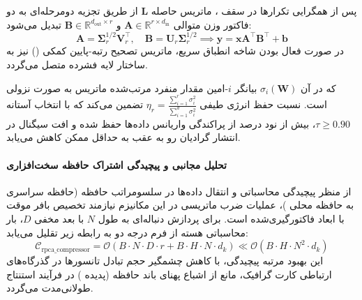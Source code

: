 پس از همگرایی تکرارها در سقف ، ماتریس حاصله $\mathbf{L}$ از طریق تجزیه دومرحله‌ای به دو فاکتور وزن متوالی $\mathbf{A} \in \mathbb{R}^{r \times d_{\text{in}}}$ و $\mathbf{B} \in \mathbb{R}^{d_{\text{out}} \times r}$ تبدیل می‌شود:
\begin{equation}
\mathbf{A} = \mathbf{\Sigma}_r^{1/2} \mathbf{V}_r^\top, \quad \mathbf{B} = \mathbf{U}_r \mathbf{\Sigma}_r^{1/2} \implies \mathbf{y} = \mathbf{x} \mathbf{A}^\top \mathbf{B}^\top + \mathbf{b}
\end{equation}
در صورت فعال بودن شاخه انطباق سریع، ماتریس تصحیح رتبه-پایین کمکی () نیز به ساختار لایه فشرده متصل می‌گردد.

که در آن $\sigma_i(\mathbf{W})$ بیانگر $i$-امین مقدار منفرد مرتب‌شده ماتریس به صورت نزولی است. نسبت حفظ انرژی طیفی $\eta_r = \frac{\sum_{i=1}^r \sigma_i^2}{\sum_{i=1}^{d} \sigma_i^2}$ تضمین می‌کند که با انتخاب آستانه $\tau \ge 0.90$، بیش از نود درصد از پراکندگی واریانس داده‌ها حفظ شده و افت سیگنال در انتشار گرادیان رو به عقب به حداقل ممکن کاهش می‌یابد.

\paragraph{تحلیل مجانبی و پیچیدگی اشتراک حافظه سخت‌افزاری}
از منظر پیچیدگی محاسباتی و انتقال داده‌ها در سلسومراتب حافظه (حافظه سراسری  به حافظه محلی )، عملیات ضرب ماتریسی در این مکانیزم نیازمند تخصیص بافر موقت با ابعاد فاکتورگیری‌شده است. برای پردازش دنباله‌ای به طول $N$ با بعد مخفی $D$، بار محاسباتی هسته از فرم درجه دو به رابطه زیر تقلیل می‌یابد:
\begin{equation}
\label{eq:complexity_rpca_compressor}
\mathcal{C}_{\text{rpca\_compressor}} = \mathcal{O}\left( B \cdot N \cdot D \cdot r + B \cdot H \cdot N \cdot d_k \right) \ll \mathcal{O}\left( B \cdot H \cdot N^2 \cdot d_k \right)
\end{equation}
این بهبود مرتبه پیچیدگی، با کاهش چشمگیر حجم تبادل تانسورها در گذرگاه‌های ارتباطی کارت گرافیک، مانع از اشباع پهنای باند حافظه (پدیده ) در فرآیند استنتاج طولانی‌مدت می‌گردد.
